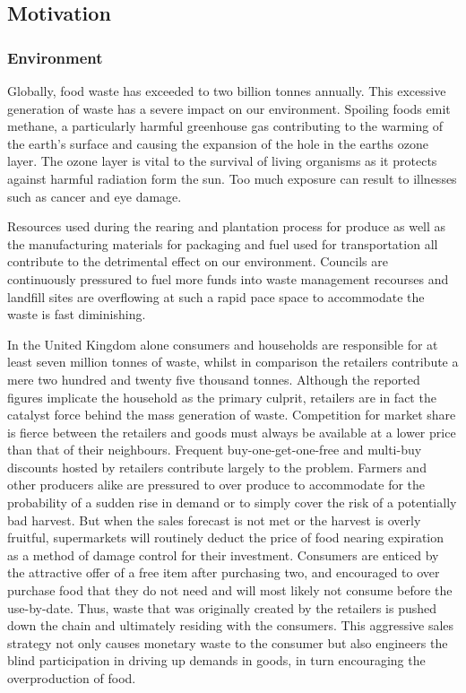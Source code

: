 \documentclass[a4paper, 11pt]{article}
\begin{document}
\subsection{Motivation}
\subsubsection{Environment}
Globally, food waste has exceeded to two billion tonnes annually.\cite{waste} This excessive generation of waste has a severe impact on our environment. Spoiling foods emit methane, a particularly harmful greenhouse gas contributing to the warming of the earth's surface and causing the expansion of the hole in the earths ozone layer. The ozone layer is vital to the survival of living organisms as it protects against harmful radiation form the sun. Too much exposure can result to illnesses such as cancer and eye damage. 

Resources used during the rearing and plantation process for produce as well as the manufacturing materials for packaging and fuel used for transportation all contribute to the detrimental effect on our environment. Councils are continuously pressured to fuel more funds into waste management recourses and landfill sites are overflowing at such a rapid pace space to accommodate the waste is fast diminishing.\cite{FoodWaste}

In the United Kingdom alone consumers and households are responsible for at least seven million tonnes of waste, whilst in comparison the retailers contribute a mere two hundred and twenty five thousand tonnes\cite{statistic}. Although the reported figures implicate the household as the primary culprit, retailers are in fact the catalyst force behind the mass generation of waste. Competition for market share is fierce between the retailers and goods must always be available at a lower price than that of their neighbours. Frequent buy-one-get-one-free and multi-buy discounts hosted by retailers contribute largely to the problem. Farmers and other producers alike are pressured to over produce to accommodate for the probability of a sudden rise in demand or to simply cover the risk of a potentially bad harvest. But when the sales forecast is not met or the harvest is overly fruitful, supermarkets will routinely deduct the price of food nearing expiration as a method of damage control for their investment. Consumers are enticed by the attractive offer of a free item after purchasing two, and encouraged to over purchase food that they do not need and will most likely not consume before the use-by-date. Thus, waste that was originally created by the retailers is pushed down the chain and ultimately residing with the consumers. This aggressive sales strategy not only causes monetary waste to the consumer but also engineers the blind participation in driving up demands in goods, in turn encouraging the overproduction of food. 
\end{document}
